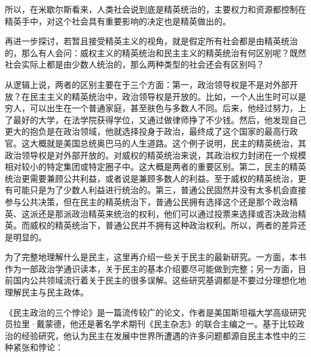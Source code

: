 所以，在米歇尔斯看来，人类社会说到底是精英统治的，主要权力和资源都控制在精英手中，对这个社会具有重要影响的决定也是精英做出的。

再进一步探讨，若暂且接受精英主义的视角，就是假定所有社会都是由精英统治的，那么有人会问：威权主义的精英统治和民主主义的精英统治有何区别呢？既然社会实际上都是由少数人统治的，那么两种类型的社会还会有区别吗？

从逻辑上说，两者的区别主要在于三个方面：第一，政治领导权是不是对外部开放？在民主主义的精英统治中，政治领导权是开放的。比如，一个人出生时可以是穷人，可以出生在一个普通家庭，甚至肤色与多数人不同。后来，他经过努力，上了最好的大学，在法学院获得学位，又通过做律师挣了不少钱。然后，他发现自己更大的抱负是在政治领域，他就选择投身于政治，最终成了这个国家的最高行政官。这大概就是美国总统奥巴马的人生道路。这个例子说明，民主的精英统治，其政治领导权是对外部开放的。对威权的精英统治来说，其政治权力封闭在一个规模相对较小的特定集团或特定圈子中。这大概是两者的重要区别。第二，民主的精英统治更需要兼顾公共利益，或者说是兼顾多数人的利益。至于威权的精英统治，更有可能只是为了少数人利益进行统治的。第三，普通公民固然并没有太多机会直接参与公共决策，但在民主的精英统治下，普通公民拥有选择这个还是那个政治精英、这派还是那派政治精英来统治的权利，他们可以通过投票来选择或否决政治精英。而威权的精英统治下，普通公民并不拥有这种政治权利。所以，两者的差异还是明显的。


为了完整地理解什么是民主，这里再介绍一些关于民主的最新研究。一方面，本书作为一部政治学通识读本，关于民主的基本介绍要尽可能做到完整；另一方面，目前国内公共领域流行着关于民主的很多误解。这些研究基调都是不要过分理想化地理解民主与民主政体。

《民主政治的三个悖论》是一篇流传较广的论文，作者是美国斯坦福大学高级研究员拉里·戴蒙德，他还是著名学术期刊《民主杂志》的联合主编之一。基于比较政治的经验研究，他认为民主在发展中世界所遭遇的许多问题都源自民主本性中的三种紧张和悖论：


